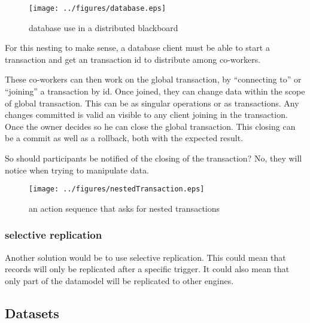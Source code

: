 \documentclass[]{lofar}
\begin{document}
        \begin{figure}
          \texttt{[image: ../figures/database.eps]}
          \hypertarget{fig:database}{}
          \caption{database use in a distributed blackboard\label{fig:database}}
        \end{figure}

        For this nesting to make sense, a database client must be able
        to start a transaction and get an transaction id to distribute
        among co-workers.

        These co-workers can then work on the global transaction, by
        ``connecting to'' or ``joining'' a transaction by id. Once joined,
        they can change data within the scope of global
        transaction. This can be as singular operations or as
        transactions. Any changes committed is valid an visible to any
        client joining in the transaction. Once the owner decides so
        he can close the global transaction. This closing can be a
        commit as well as a rollback, both with the expected result.
     
        So should participants be notified of the closing of the
        transaction?  No, they will notice when trying to manipulate
        data.

        \begin{figure}
          \texttt{[image: ../figures/nestedTransaction.eps]}
          \hypertarget{fig:nestedTransaction}{}
          \caption{an action sequence that asks for nested transactions\label{fig:nestedTransactions}}
        \end{figure}

      \subsubsection{selective replication}
      \label{subsubsec:selective-replication}\hypertarget{subsubsec:selective-replication}{}%

        Another solution would be to use selective replication. This
        could mean that records will only be replicated after a
        specific trigger. It could also mean that only part of the
        datamodel will be replicated to other engines.

    \subsection{Datasets}
    \label{subsec:Datasets}\hypertarget{subsec:Datasets}{}%
\end{document}

